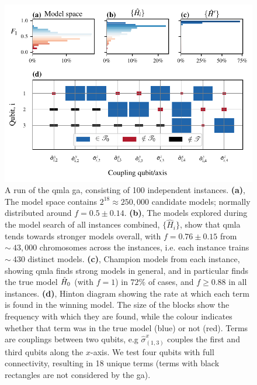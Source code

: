 \par 
\begin{figure}
    \begin{center}
        \includegraphics{theoretical_study/figures/gen_alg_run.pdf}
    \end{center}
    \caption[\Gls{run} of \gls{qmla} \gls{ga}.]{
        A \gls{run} of the \gls{qmla} \gls{ga}, consisting of 100 independent \glspl{instance}.
        \textbf{(a)}, The model space contains $2^{18}\approx250,000$ candidate models; 
            normally distributed around $f=0.5 \pm 0.14$. 
        \textbf{(b)}, The models explored during the model search of all instances combined, 
            $\{\hat{H}_i\}$, show that \gls{qmla} tends towards stronger models overall, 
            with $f = 0.76 \pm 0.15$ from $\sim~43,000$ chromosomes across the instances, 
            i.e. each instance trains $\sim~430$ distinct models. 
        \textbf{(c)}, Champion models from each instance, showing \gls{qmla} finds strong models 
            in general, and in particular finds the true model $\hat{H}_0$ (with $f=1$) in $72\%$ of cases, 
            and $f \geq 0.88$ in all instances. 
        \textbf{(d)}, Hinton diagram showing the rate at which each term is found in the winning model. 
            The size of the blocks show the frequency with which they are found, while the colour indicates 
            whether that term was in the true model (blue) or not (red).
            Terms are couplings between two qubits, e.g $\hat{\sigma}_{(1, 3)}^{x}$ 
                couples the first and third qubits along the $x$-axis. 
            We test four qubits with full connectivity, resulting in 18 unique terms 
            (terms with black rectangles are not considered by the \gls{ga}).
}
    \label{fig:ga_run}
\end{figure}


